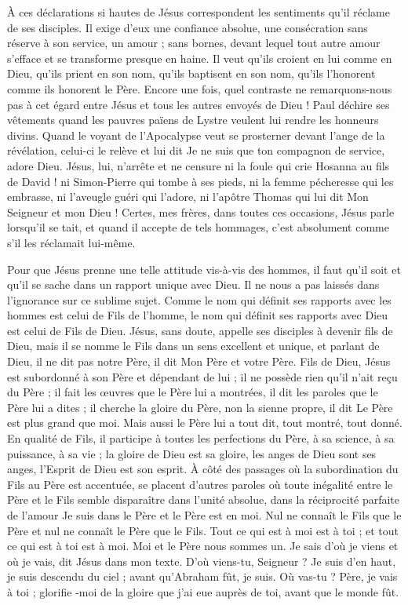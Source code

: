 À ces déclarations si hautes de Jésus correspondent les sentiments qu’il réclame de ses disciples. Il exige d’eux une confiance absolue, une consécration sans réserve à son service, un amour ; sans bornes, devant lequel tout autre amour s’efface et se transforme presque en haine. Il veut qu’ils croient en lui comme en Dieu, qu’ils prient en son nom, qu’ils baptisent en son nom, qu’ils l’honorent comme ils honorent le Père. Encore une fois, quel contraste ne remarquons-nous pas à cet égard entre Jésus et tous les autres envoyés de Dieu ! Paul déchire ses vêtements quand les pauvres païens de Lystre veulent lui rendre les honneurs divins. Quand le voyant de l’Apocalypse veut se prosterner devant l’ange de la révélation, celui-ci le relève et lui dit\frcolon{} \Og{} Je ne suis que ton compagnon de service, adore Dieu.\Fg{} Jésus, lui, n’arrête et ne censure ni la foule qui crie\frcolon{} \Og{} Hosanna au fils de David !\Fg{} ni Simon-Pierre qui tombe à ses pieds, ni la femme pécheresse qui les embrasse, ni l’aveugle guéri qui l’adore, ni l’apôtre Thomas qui lui dit\frcolon{} \Og{} Mon Seigneur et mon Dieu !\Fg{} Certes, mes frères, dans toutes ces occasions, Jésus parle lorsqu’il se tait, et quand il accepte de tels hommages, c’est absolument comme s’il les réclamait lui-même.

Pour que Jésus prenne une telle attitude vis-à-vis des hommes, il faut qu’il soit et qu’il se sache dans un rapport unique avec Dieu. Il ne nous a pas laissés dans l’ignorance sur ce sublime sujet. Comme le nom qui définit ses rapports avec les hommes est celui de Fils de l’homme, le nom qui définit ses rapports avec Dieu est celui de Fils de Dieu. Jésus, sans doute, appelle ses disciples à devenir fils de Dieu, mais il se nomme \Og{} le Fils\Fg{} dans un sens excellent et unique, et parlant de Dieu, il ne dit pas \Og{} notre Père\Fg{}, il dit\frcolon{} \Og{} Mon Père et votre Père.\Fg{} Fils de Dieu, Jésus est subordonné à son Père et dépendant de lui ; il ne possède rien qu’il n’ait reçu du Père ; il fait les œuvres que le Père lui a montrées, il dit les paroles que le Père lui a dites ; il cherche la gloire du Père, non la sienne propre, il dit\frcolon{} \Og{} Le Père est plus grand que moi.\Fg{} Mais aussi le Père lui a tout dit, tout montré, tout donné. En qualité de Fils, il participe à toutes les perfections du Père, à sa science, à sa puissance, à sa vie ; la gloire de Dieu est sa gloire, les anges de Dieu sont ses anges, l’Esprit de Dieu est son esprit. À côté des passages où la subordination du Fils au Père est accentuée, se placent d’autres paroles où toute inégalité entre le Père et le Fils semble disparaître dans l’unité absolue, dans la réciprocité parfaite de l’amour\frcolon{} \Og{} Je suis dans le Père et le Père est en moi. Nul ne connaît le Fils que le Père et nul ne connaît le Père que le Fils. Tout ce qui est à moi est à toi ; et tout ce qui est à toi est à moi. Moi et le Père nous sommes un.\Fg{} \ocadr{} \Og{} Je sais d’où je viens et où je vais\Fg{}, dit Jésus dans mon texte. \ocadr{} D’où viens-tu, Seigneur ? \ocadr{} \Og{} Je suis d’en haut, je suis descendu du ciel ; avant qu’Abraham fût, je suis.\Fg{} \ocadr{} Où vas-tu ? \ocadr{} \Og{} Père, je vais à toi ; glorifie -moi de la gloire que j’ai eue auprès de toi, avant que le monde fût.\Fg{}

